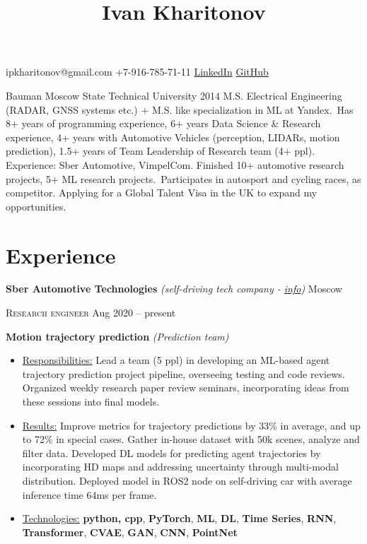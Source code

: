 \documentclass[12pt, a4paper]{extarticle}
\newcommand{\mymk}[1]{\textbf{#1}}
\newcommand{\placeheadding}[3]{\textbf{#1} \textit{#2} \hfill #3\null}
\newcommand{\positionheading}[2]{\par\noindent \textsc{#1} \hfill #2}
\newcommand{\ressubheading}[5]{\placeheadding{#1}{#2}{#3} \positionheading{#4}{#5}}
\newcommand*{\sectionformat}{\centering}
\begin{document}
\setlength{\droptitle}{-10em}
\title{\bfseries\Huge Ivan Kharitonov}
\author{}
\date{}
%  
\maketitle
\vspace{-9.5em}
% 
\par
ipkharitonov@gmail.com \hfill +7-916-785-71-11 \hfill \href{https://www.linkedin.com/in/ivan-kharitonov-main/}{LinkedIn} \hfill \href{https://github.com/neer201}{GitHub}
\par
%
Bauman Moscow State Technical University 2014  M.S. Electrical Engineering (RADAR, GNSS systems etc.) + M.S. like specialization in ML at Yandex.\
Has 8+ years of programming experience, 6+ years Data Science \& Research experience, 4+ years with Automotive Vehicles (perception, LIDARs, motion prediction), 1.5+ years of Team Leadership of Research team (4+ ppl). Experience: Sber Automotive, VimpelCom. Finished 10+ automotive research projects, 5+ ML research projects.\
Participates in autosport and cycling races, as competitor. Applying for a Global Talent Visa in the UK to expand my opportunities.
%
\section*{\sectionformat Experience}
% 
\ressubheading{Sber Automotive Technologies}{(self-driving tech company - \href{https://sberautotech.ru/}{info})}{Moscow}{Research engineer}{Aug 2020 -- present}


\textbf{Motion trajectory prediction} \textit{(Prediction team)}
\begin{itemize}
	\item[] \underline{Responsibilities:} Lead a team (5 ppl) in developing an ML-based agent trajectory prediction project pipeline, overseeing testing and code reviews. Organized weekly research paper review seminars, incorporating ideas from these sessions into final models.
	\item[] \underline{Results:} Improve metrics for trajectory predictions by 33\% in average, and up to 72\% in special cases. Gather in-house dataset with 50k scenes, analyze and filter data. Developed DL models for predicting agent trajectories by incorporating HD maps and addressing uncertainty through multi-modal distribution. Deployed model in ROS2 node on self-driving car with average inference time 64ms per frame.
	\item[] \underline{Technologies:} \mymk{python, cpp}, \mymk{PyTorch}, \mymk{ML}, \mymk{DL}, \mymk{Time Series}, \mymk{RNN}, \mymk{Transformer}, \mymk{CVAE}, \mymk{GAN}, \mymk{CNN}, \mymk{PointNet}
\end{itemize}
\end{document}
